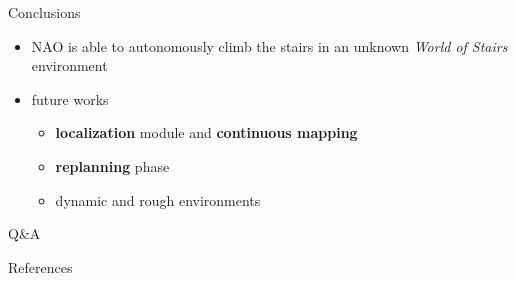 \documentclass[10pt]{beamer}
\begin{document}
\begin{frame}{Conclusions}
  \begin{itemize}
		\item NAO is able to autonomously climb the stairs in an unknown
				\textit{World of Stairs} environment
    \item future works
    \begin{itemize}
      \item \textbf{localization} module and \textbf{continuous mapping}
		  \item \textbf{replanning} phase
		  \item dynamic and rough environments
    \end{itemize}
	\end{itemize}
\end{frame}

\begin{frame}[standout]
    Q\&A
\end{frame}

\appendix

\begin{frame}{References}
  
  
\end{frame}
\end{document}
